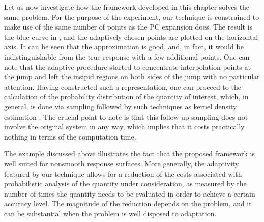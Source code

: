 Let us now investigate how the framework developed in this chapter solves the
same problem. For the purpose of the experiment, our technique is constrained to
make use of the same number of points as the \ac{PC} expansion does. The result
is the blue curve in , and the adaptively chosen
points are plotted on the horizontal axis. It can be seen that the approximation
is good, and, in fact, it would be indistinguishable from the true response with
a few additional points. One can note that the adaptive procedure started to
concentrate interpolation points at the jump and left the insipid regions on
both sides of the jump with no particular attention. Having constructed such a
representation, one can proceed to the calculation of the probability
distribution of the quantity of interest, which, in general, is done via
sampling followed by such techniques as kernel density estimation
\cite{hastie2013}. The crucial point to note is that this follow-up sampling
does not involve the original system in any way, which implies that it costs
practically nothing in terms of the computation time.

The example discussed above illustrates the fact that the proposed framework is
well suited for nonsmooth response surfaces. More generally, the adaptivity
featured by our technique allows for a reduction of the costs associated with
probabilistic analysis of the quantity under consideration, as measured by the
number of times the quantity needs to be evaluated in order to achieve a certain
accuracy level. The magnitude of the reduction depends on the problem, and it
can be substantial when the problem is well disposed to adaptation.
